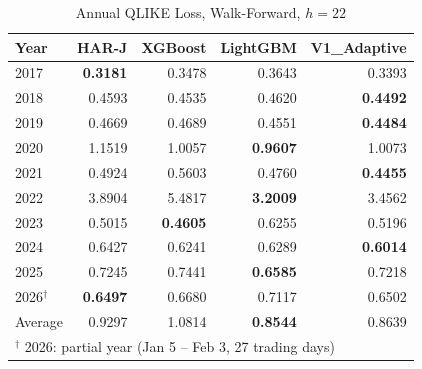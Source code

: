 \begin{table}[htbp]
\centering
\caption{Annual QLIKE Loss, Walk-Forward, $h=22$}
\label{tab:qlike_wf_h22}
\begin{tabular}{lrrrr}
\toprule
Year & HAR-J & XGBoost & LightGBM & V1\_Adaptive \\
\midrule
2017 & \textbf{0.3181} & 0.3478 & 0.3643 & 0.3393 \\
2018 & 0.4593 & 0.4535 & 0.4620 & \textbf{0.4492} \\
2019 & 0.4669 & 0.4689 & 0.4551 & \textbf{0.4484} \\
2020 & 1.1519 & 1.0057 & \textbf{0.9607} & 1.0073 \\
2021 & 0.4924 & 0.5603 & 0.4760 & \textbf{0.4455} \\
2022 & 3.8904 & 5.4817 & \textbf{3.2009} & 3.4562 \\
2023 & 0.5015 & \textbf{0.4605} & 0.6255 & 0.5196 \\
2024 & 0.6427 & 0.6241 & 0.6289 & \textbf{0.6014} \\
2025 & 0.7245 & 0.7441 & \textbf{0.6585} & 0.7218 \\
2026$^{\dagger}$ & \textbf{0.6497} & 0.6680 & 0.7117 & 0.6502 \\
\midrule
Average & 0.9297 & 1.0814 & \textbf{0.8544} & 0.8639 \\
\bottomrule
\multicolumn{5}{l}{\footnotesize $^\dagger$ 2026: partial year (Jan 5 -- Feb 3, 27 trading days)} \\
\end{tabular}
\end{table}